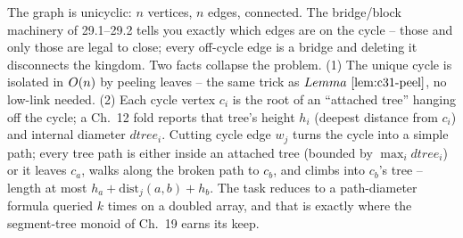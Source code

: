 The graph is unicyclic: \(n\) vertices, \(n\) edges, connected.  The bridge/block
machinery of 29.1--29.2 tells you exactly which edges are on the cycle -- those
and only those are legal to close; every off-cycle edge is a bridge and deleting
it disconnects the kingdom.  Two facts collapse the problem.  (1) The unique
cycle is isolated in \(O(n)\) by peeling leaves -- the same trick as
\(\lemref{c31-peel}\), no low-link needed.  (2) Each cycle vertex \(c_i\) is the root
of an ``attached tree'' hanging off the cycle; a Ch.~12 fold reports that tree's
height \(h_i\) (deepest distance from \(c_i\)) and internal diameter
\(\mathit{dtree}_i\).  Cutting cycle edge \(w_j\) turns the cycle into a simple path;
every tree path is either inside an attached tree (bounded by
\(\max_i\mathit{dtree}_i\)) or it leaves \(c_a\), walks along the broken path to
\(c_b\), and climbs into \(c_b\)'s tree -- length at most
\(h_a+\mathrm{dist}_j(a,b)+h_b\).  The task reduces to a path-diameter formula
queried \(k\) times on a doubled array, and that is exactly where the
segment-tree monoid of Ch.~19 earns its keep.

